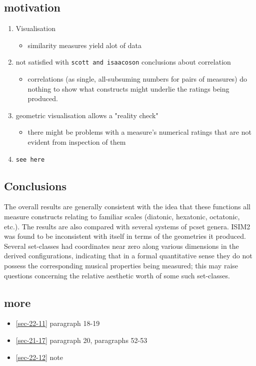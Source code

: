 \documentclass[11pt]{article}
\begin{document}
{{\subsection{motivation}
\label{sec-15-2}
\begin{enumerate}
\item Visualisation
\begin{itemize}
\item similarity measures yield alot of data
\end{itemize}
\item not satisfied with \texttt{scott and isaacoson} conclusions about
correlation
\begin{itemize}
\item correlations (as single, all-subsuming numbers for pairs of
measures) do nothing to show what constructs might underlie
the ratings being produced.
\end{itemize}
\item geometric visualisation allows a "reality check"
\begin{itemize}
\item there might be problems with a measure's numerical ratings
that are not evident from inspection of them
\end{itemize}
\item \texttt{see here}
\end{enumerate}

\subsection{Conclusions}
\label{sec-15-3}
The overall results are generally consistent with the idea that
these functions all measure constructs relating to familiar scales
(diatonic, hexatonic, octatonic, etc.). The results are also
compared with several systems of pcset genera. ISIM2 was found to
be inconsistent with itself in terms of the geometries it
produced. Several set-classes had coordinates near zero along
various dimensions in the derived configurations, indicating that
in a formal quantitative sense they do not possess the
corresponding musical properties being measured; this may raise
questions concerning the relative aesthetic worth of some such
set-classes.

\subsection{more}
\label{sec-15-4}
\begin{itemize}
\item \ref{sec-22-11} paragraph 18-19
\item \ref{sec-21-17} paragraph 20, paragraphs 52-53
\item \ref{sec-22-12} note
\end{itemize}

}}
\end{document}
